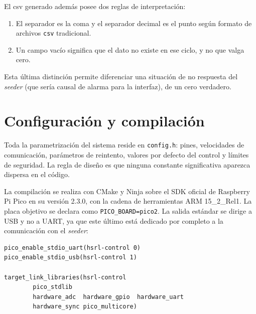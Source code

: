 El csv generado además posee dos reglas de interpretación:

\begin{enumerate}
\item El separador es la coma y el separador decimal es el punto según formato de archivos \texttt{csv} tradicional.
\item Un campo vacío significa que el dato no existe en ese ciclo, y no que valga cero.
\end{enumerate}

Esta última distinción permite diferenciar una situación de no respuesta del \emph{seeder} (que sería causal de alarma para la interfaz), de un cero verdadero.

\section{Configuración y compilación}
\label{sec:fw-build}

Toda la parametrización del sistema reside en \texttt{config.h}: pines, velocidades de comunicación, parámetros de reintento, valores por defecto del control y límites de seguridad. La regla de diseño es que ninguna constante significativa aparezca dispersa en el código.

La compilación se realiza con CMake y Ninja sobre el SDK oficial de Raspberry Pi Pico en su versión 2.3.0, con la cadena de herramientas ARM 15\_2\_Rel1. La placa objetivo se declara como \texttt{PICO\_BOARD=pico2}. La salida estándar se dirige a USB y no a UART, ya que este último está dedicado por completo a la comunicación con el \emph{seeder}:

\begin{lstlisting}[basicstyle=\ttfamily\footnotesize,columns=fullflexible,
  frame=single,rulecolor=\color{black!30}]
pico_enable_stdio_uart(hsrl-control 0)
pico_enable_stdio_usb(hsrl-control 1)

target_link_libraries(hsrl-control
        pico_stdlib
        hardware_adc  hardware_gpio  hardware_uart
        hardware_sync pico_multicore)
\end{lstlisting}

